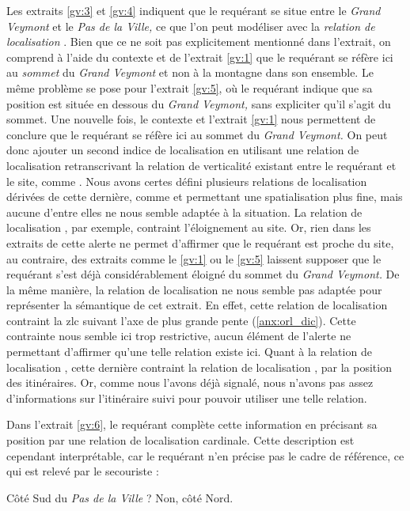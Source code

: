 Les extraits \ref{gv:3} et \ref{gv:4} indiquent que le requérant se
situe entre le \emph{Grand Veymont} et le \emph{Pas de la Ville,} ce
que l'on peut modéliser avec la \emph{relation de localisation}
. Bien que ce ne soit pas explicitement
mentionné dans l'extrait, on comprend à l'aide du contexte et de
l'extrait \ref{gv:1} que le requérant se réfère ici au \emph{sommet}
du \emph{Grand Veymont} et non à la montagne dans son ensemble. Le
même problème se pose pour l'extrait \ref{gv:5}, où le requérant
indique que sa position est située en dessous du \emph{Grand Veymont,}
sans expliciter qu'il s'agit du sommet. Une nouvelle fois, le contexte
et l'extrait \ref{gv:1} nous permettent de conclure que le requérant
se réfère ici au sommet du \emph{Grand Veymont.} On peut donc ajouter
un second indice de localisation en utilisant une relation de
localisation retranscrivant la relation de verticalité existant entre
le requérant et le site, comme . Nous avons
certes défini plusieurs relations de localisation dérivées de cette
dernière, comme  et permettant une
spatialisation plus fine, mais aucune d'entre elles ne nous semble
adaptée à la situation. La relation de localisation
, par exemple, contraint l'éloignement au
site. Or, rien dans les extraits de cette alerte ne permet d'affirmer
que le requérant est proche du site, au contraire, des extraits comme
le \ref{gv:1} ou le \ref{gv:5} laissent supposer que le requérant
s'est déjà considérablement éloigné du sommet du \emph{Grand Veymont.}
De la même manière, la relation de localisation
 ne nous semble pas adaptée pour
représenter la sémantique de cet extrait. En effet, cette relation de
localisation contraint la \ac{zlc} suivant l'axe de plus grande pente
(\autoref{anx:orl_dic}). Cette contrainte nous semble ici trop
restrictive, aucun élément de l'alerte ne permettant d'affirmer qu'une
telle relation existe ici. Quant à la relation de localisation
, cette dernière contraint la
relation de localisation , par la position
des itinéraires. Or, comme nous l'avons déjà signalé, nous n'avons pas
assez d'informations sur l'itinéraire suivi pour pouvoir utiliser une
telle relation.

Dans l'extrait \ref{gv:6}, le requérant complète cette information en
précisant sa position par une relation de localisation
cardinale. Cette description est cependant interprétable, car le
requérant n'en précise pas le cadre de référence, ce qui est relevé
par le secouriste :
%
\begin{dialogue*}
  \Sec {} Côté Sud du \emph{Pas de la Ville} ?
%
  \Req {} Non, côté Nord.
\end{dialogue*}

